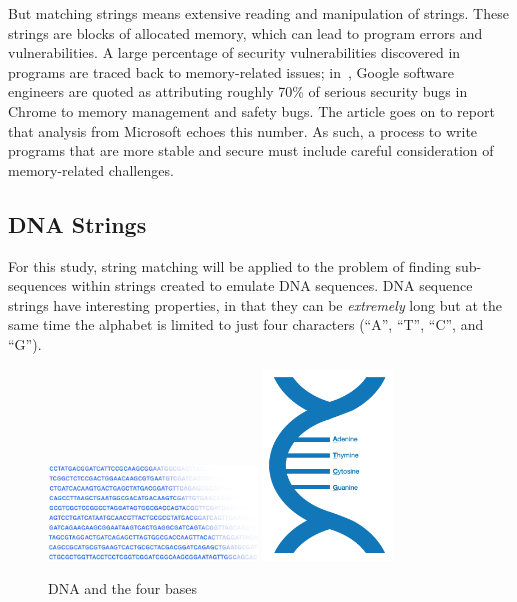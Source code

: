 But matching strings means extensive reading and manipulation of strings. These strings are blocks of allocated memory, which can lead to program errors and vulnerabilities. A large percentage of security vulnerabilities discovered in programs are traced back to memory-related issues; in~\cite{cimpanu}, Google software engineers are quoted as attributing roughly 70\% of serious security bugs in Chrome to memory management and safety bugs. The article goes on to report that analysis from Microsoft echoes this number. As such, a process to write programs that are more stable and secure must include careful consideration of memory-related challenges.

\subsection{DNA Strings}

For this study, string matching will be applied to the problem of finding sub-sequences within strings created to emulate DNA sequences. DNA sequence strings have interesting properties, in that they can be \textit{extremely} long but at the same time the alphabet is limited to just four characters (``A'', ``T'', ``C'', and ``G'').

\begin{figure}[ht]
    \centering
    \begin{minipage}{6in}
        \centering
        \includegraphics[align=c,height=1in]{figures/dna2.png}
        \hspace*{.2in}
        \includegraphics[align=c,height=2in]{figures/dna.png}
    \end{minipage}\hfill
    \caption{DNA and the four bases}
    \label{fig:image:dna}
\end{figure}

